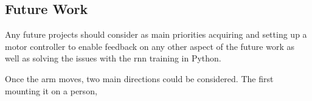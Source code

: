 \subsection{Future Work}

Any future projects should consider as main priorities acquiring and setting up a motor controller to enable feedback on any other aspect of the future work
as well as solving the issues with the \acrshort{rnn} training in Python.

Once the arm moves, two main directions could be considered. The first mounting it on a person, 